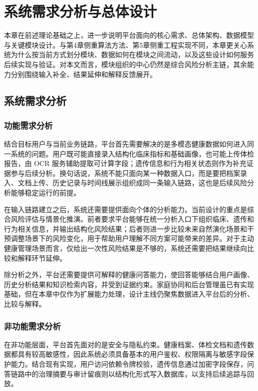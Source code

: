 
\chapter{系统需求分析与总体设计}

本章在前述理论基础之上，进一步说明平台面向的核心需求、总体架构、数据模型与关键模块设计。与第4章侧重算法方法、第5章侧重工程实现不同，本章更关心系统为什么按当前方式划分模块、数据如何在模块之间流动，以及这些设计如何服务后续实现与验证。对本文而言，模块组织的中心仍然是综合风险分析主链，其余能力分别围绕输入补全、结果延伸和解释反馈展开。

\section{系统需求分析}

\subsection{功能需求分析}

结合目标用户与当前业务链路，平台首先需要解决的是多模态健康数据如何进入同一系统的问题。用户既可能直接录入结构化临床指标和基础画像，也可能上传体检报告，由 OCR 服务辅助提取可计算字段；遗传信息和行为相关状态则作为补充证据参与后续分析。换句话说，系统不能只面向某一种数据入口，而是要把档案录入、文档上传、历史记录与时间线展示组织成同一条输入链路，这也是后续风险分析能够稳定运行的前提。

在输入链路建立之后，系统还需要提供面向个体的分析能力。当前设计的重点是综合风险评估与情景化推演。前者要求平台能够在统一分析入口下组织临床、遗传和行为相关信息，并输出结构化风险结果；后者则进一步比较未来自然演化场景和干预调整场景下的风险变化，用于帮助用户理解不同方案可能带来的差异。对于主动健康管理场景而言，仅给出一次性风险结果是不够的，系统还需要把结果继续向比较和解释环节延伸。

除分析之外，平台还需要提供可解释的健康问答能力，使回答能够结合用户画像、历史分析结果和知识检索内容，并受到证据约束。家庭协同和后台管理虽已有实现基础，但在本章中仅作为扩展能力处理，设计主线仍聚焦数据进入平台后的分析、比较与解释。

\subsection{非功能需求分析}

在非功能层面，平台首先面对的是安全与隐私约束。健康档案、体检文档和遗传数据都具有较高敏感性，因此系统必须具备基本的用户鉴权、权限隔离与敏感字段保护能力。结合现有实现，用户访问依赖令牌校验，遗传信息通过加密字段保存，问答链路中的治理摘要与审计留痕则以结构化形式写入数据库，以支持后续追踪与回放。

